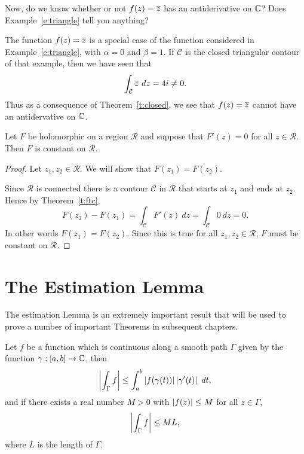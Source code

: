 \begin{example}
Now, do we know whether or not $f(z)=\overline{z}$ has an antiderivative on $\mathbb{C}$?  Does Example~\ref{e:triangle} tell you anything?
\end{example}
\begin{solution}
 The function $f(z) = \overline{z}$ is a special case of the function considered in Example~\ref{e:triangle}, with $\alpha =0$ and $\beta =1$.  If $\mathcal{C}$ is the closed triangular contour of that example, then we have seen that
\[
\int_{\mathcal{C}}  \overline{z}\ dz = 4i \neq 0.
\]
Thus as a consequence of Theorem~\ref{t:closed}, we see that $f(z)=\overline{z}$ cannot have an antidervative on $\mathbb{C}$.
\end{solution}
\begin{theorem}
Let $F$ be holomorphic on a region $\mathcal{R}$ and suppose that $F'(z)=0$ for all $z \in \mathcal{R}$.  Then $F$ is constant on $\mathcal{R}$.
\end{theorem}
\begin{proof}
Let $z_1,z_2 \in \mathcal{R}$.  We will show that $F(z_1)=F(z_2)$.

Since $\mathcal{R}$ is connected there is a contour $\mathcal{C}$ in $\mathcal{R}$ that starts at $z_1$ and ends at $z_2$.  Hence by Theorem~\ref{t:ftc},
\[
F(z_2)-F(z_1) = \int_{\mathcal{C}} F'(z)\ dz = \int_{\mathcal{C}} 0\ dz = 0.
\]
In other words $F(z_1)=F(z_2)$.  Since this is true for all $z_1,z_2 \in \mathcal{R}$, $F$ must be constant on $\mathcal{R}$.
\end{proof}

\section{The Estimation Lemma}
The estimation Lemma is an extremely important result that will be used to prove a number of important Theorems in subsequent chapters.  

\begin{lemma}
Let $f$ be a function which is continuous along a smooth path $\Gamma$ given by the function $\gamma : [a,b] \to \mathbb{C}$, then
\[
\left|  \int_{\Gamma} f  \right| \leq \int_a^b \left|  f(\gamma(t)) \right| \left|  \gamma' (t)  \right|\ dt,
\] 
 and if there exists a real number $M>0$ with $\left| f(z) \right| \leq M$ for all $z \in \Gamma$,
\[
\left| \int_{\Gamma} f \right| \leq ML,
\]
where $L$ is the length of $\Gamma$.
\end{lemma}

